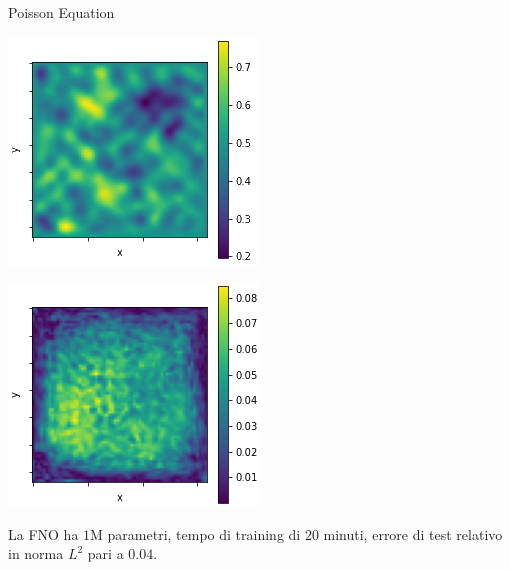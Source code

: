 \documentclass[aspectratio=169]{beamer}
\begin{document}
\begin{frame}[t]{Poisson Equation}
\begin{center}
\begin{minipage}{0.24\textwidth}
        \end{minipage}
        \hfill
        \begin{minipage}{0.24\textwidth}
            \includegraphics[width=\textwidth]{operators/poisson/FNOappro.png}
        \end{minipage}
        \hfill
        \begin{minipage}{0.24\textwidth}
            \includegraphics[width=\textwidth]{operators/poisson/error.png}
        \end{minipage}
    \end{center}
    La FNO ha $1$M parametri, tempo di training di $20$ minuti, errore di test relativo in norma $L^{2}$ pari a $0.04$.
\end{frame}
\end{document}
